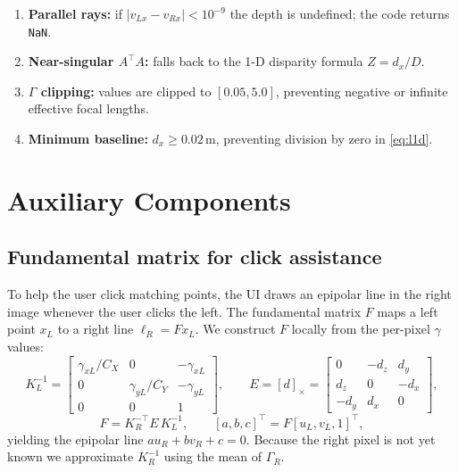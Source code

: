 \documentclass[11pt]{article}
\begin{document}
\begin{enumerate}[leftmargin=2em]
  \item \textbf{Parallel rays:} if $|v_{Lx} - v_{Rx}| < 10^{-9}$ the depth is undefined;
        the code returns \texttt{NaN}.
  \item \textbf{Near-singular $A^\top A$:} falls back to the 1-D disparity formula $Z =
        d_x / D$.
  \item \textbf{$\Gamma$ clipping:} values are clipped to $[0.05, 5.0]$, preventing
        negative or infinite effective focal lengths.
  \item \textbf{Minimum baseline:} $d_x \geq 0.02$\,m, preventing division by zero in
        \eqref{eq:l1d}.
\end{enumerate}

\section{Auxiliary Components}

\subsection{Fundamental matrix for click assistance}

To help the user click matching points, the UI draws an epipolar line in the right image
whenever the user clicks the left. The fundamental matrix $F$ maps a left point $x_L$ to a
right line $\ell_R = F x_L$. We construct $F$ locally from the per-pixel $\gamma$ values:
\begin{equation}
K_L^{-1} = \begin{bmatrix}
\gamma_{xL}/C_X & 0 & -\gamma_{xL} \\
0 & \gamma_{yL}/C_Y & -\gamma_{yL} \\
0 & 0 & 1
\end{bmatrix},
\qquad
E = [d]_\times = \begin{bmatrix}
0 & -d_z & d_y \\
d_z & 0 & -d_x \\
-d_y & d_x & 0
\end{bmatrix},
\end{equation}
\begin{equation}
F = K_R^{-\top} E\, K_L^{-1}, \qquad
[a, b, c]^\top = F [u_L, v_L, 1]^\top,
\end{equation}
yielding the epipolar line $a u_R + b v_R + c = 0$. Because the right pixel is not yet
known we approximate $K_R^{-1}$ using the mean of $\Gamma_R$.
\end{document}
